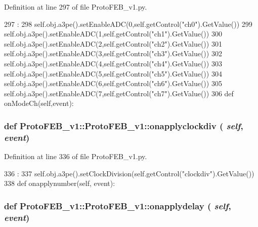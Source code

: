 Definition at line 297 of file ProtoFEB\_\-v1.py.


\begin{DoxyCode}
297                               :
298         self.obj.a3pe().setEnableADC(0,self.getControl("ch0").GetValue())
299         self.obj.a3pe().setEnableADC(1,self.getControl("ch1").GetValue())
300         self.obj.a3pe().setEnableADC(2,self.getControl("ch2").GetValue())
301         self.obj.a3pe().setEnableADC(3,self.getControl("ch3").GetValue())
302         self.obj.a3pe().setEnableADC(4,self.getControl("ch4").GetValue())
303         self.obj.a3pe().setEnableADC(5,self.getControl("ch5").GetValue())
304         self.obj.a3pe().setEnableADC(6,self.getControl("ch6").GetValue())
305         self.obj.a3pe().setEnableADC(7,self.getControl("ch7").GetValue())
306 
    def onModeCh(self,event):
\end{DoxyCode}
\hypertarget{classProtoFEB__v1_1_1ProtoFEB__v1_a882ff6d6c37f5386921657544e66028e}{
\subsubsection[{onapplyclockdiv}]{\setlength{\rightskip}{0pt plus 5cm}def ProtoFEB\_\-v1::ProtoFEB\_\-v1::onapplyclockdiv ( {\em self}, \/   {\em event})}}
\label{classProtoFEB__v1_1_1ProtoFEB__v1_a882ff6d6c37f5386921657544e66028e}


Definition at line 336 of file ProtoFEB\_\-v1.py.


\begin{DoxyCode}
336                                     :
337         self.obj.a3pe().setClockDivision(self.getControl("clockdiv").GetValue())
338 
    def onapplynumber(self, event):
\end{DoxyCode}
\hypertarget{classProtoFEB__v1_1_1ProtoFEB__v1_a2192e3d5539152859e0388ecfb2410c7}{
\subsubsection[{onapplydelay}]{\setlength{\rightskip}{0pt plus 5cm}def ProtoFEB\_\-v1::ProtoFEB\_\-v1::onapplydelay ( {\em self}, \/   {\em event})}}
\label{classProtoFEB__v1_1_1ProtoFEB__v1_a2192e3d5539152859e0388ecfb2410c7}


